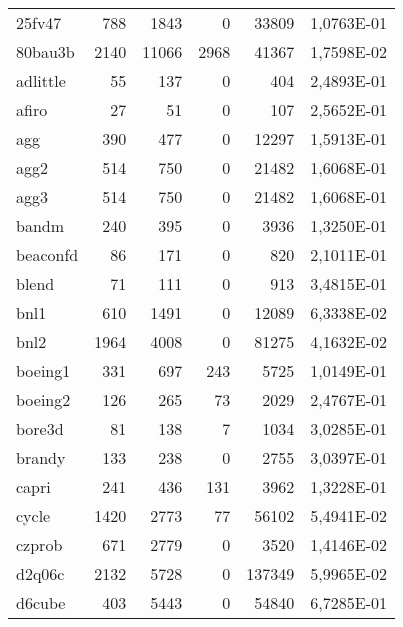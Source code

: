 {\begin{longtable}{>{\ttfamily}lrrrrc}
25fv47       & 788       & 1843      & 0           & 33809    & \num{1,0763E-01} \\
80bau3b      & 2140      & 11066     & 2968        & 41367    & \num{1,7598E-02} \\
adlittle     & 55        & 137       & 0           & 404      & \num{2,4893E-01} \\
afiro        & 27        & 51        & 0           & 107      & \num{2,5652E-01} \\
agg          & 390       & 477       & 0           & 12297    & \num{1,5913E-01} \\
agg2         & 514       & 750       & 0           & 21482    & \num{1,6068E-01} \\
agg3         & 514       & 750       & 0           & 21482    & \num{1,6068E-01} \\
bandm        & 240       & 395       & 0           & 3936     & \num{1,3250E-01} \\
beaconfd     & 86        & 171       & 0           & 820      & \num{2,1011E-01} \\
blend        & 71        & 111       & 0           & 913      & \num{3,4815E-01} \\
bnl1         & 610       & 1491      & 0           & 12089    & \num{6,3338E-02} \\
bnl2         & 1964      & 4008      & 0           & 81275    & \num{4,1632E-02} \\
boeing1      & 331       & 697       & 243         & 5725     & \num{1,0149E-01} \\
boeing2      & 126       & 265       & 73          & 2029     & \num{2,4767E-01} \\
bore3d       & 81        & 138       & 7           & 1034     & \num{3,0285E-01} \\
brandy       & 133       & 238       & 0           & 2755     & \num{3,0397E-01} \\
capri        & 241       & 436       & 131         & 3962     & \num{1,3228E-01} \\
cycle        & 1420      & 2773      & 77          & 56102    & \num{5,4941E-02} \\
czprob       & 671       & 2779      & 0           & 3520     & \num{1,4146E-02} \\
d2q06c       & 2132      & 5728      & 0           & 137349   & \num{5,9965E-02} \\
d6cube       & 403       & 5443      & 0           & 54840    & \num{6,7285E-01} \\

\end{longtable}}

